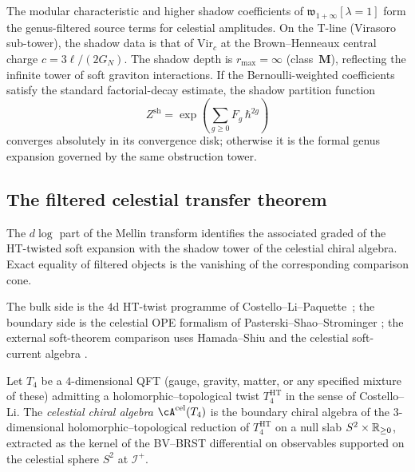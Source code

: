 \begin{remark}
\label{rem:ch-core-w-shadow}
The modular characteristic and higher shadow coefficients of
$\mathfrak{w}_{1+\infty}[\lambda = 1]$ form the genus-filtered
source terms for celestial amplitudes. On the T-line (Virasoro
sub-tower), the shadow data is that of $\mathrm{Vir}_c$ at the
Brown--Henneaux central charge $c = 3\ell/(2G_N)$. The shadow
depth is $r_{\max} = \infty$ (class~$\mathbf{M}$),
reflecting the infinite tower of soft graviton interactions.
If the Bernoulli-weighted coefficients satisfy the standard
factorial-decay estimate, the shadow partition function
\[
Z^{\mathrm{sh}}=\exp\!\left(\sum_{g\geq0}F_g\,\hbar^{2g}\right)
\]
converges absolutely in its convergence disk; otherwise it is the
formal genus expansion governed by the same obstruction tower.
\end{remark}


\subsection{The filtered celestial transfer theorem}
\label{subsec:filtered-celestial-transfer}

The $d\log$ part of the Mellin transform identifies the associated graded of the HT-twisted soft expansion with the shadow tower of the celestial chiral algebra. Exact equality of filtered objects is the vanishing of the corresponding comparison cone.

The bulk side is the $4$d HT-twist programme of
Costello--Li--Paquette~\cite{CL16,
CostelloPaquetteTwistedSugraStates}; the boundary side is the
celestial OPE formalism of Pasterski--Shao--Strominger
\cite{PasterskiShaoStromingerFlatSpaceHolog,StromingerLectures2018};
the external soft-theorem comparison uses Hamada--Shiu
\cite{HamadaShiuSubsubSoft} and the celestial soft-current algebra
\cite{GuevaraHimwichPateStrominger21,StromingerWInfinityCelestial}.

\begin{definition}
\label{def:celestial-chiral-algebra-ht-twist}
Let $T_4$ be a $4$-dimensional QFT (gauge, gravity, matter, or any
specified mixture of these) admitting a holomorphic--topological twist $T_4^{\mathrm{HT}}$
in the sense of Costello--Li. The \emph{celestial chiral algebra}
$\cA^{\mathrm{cel}}(T_4)$ is the boundary chiral algebra of the
$3$-dimensional holomorphic--topological reduction of $T_4^{\mathrm{HT}}$
on a null slab $S^2 \times \mathbb R_{\geq 0}$, extracted as the kernel of the
BV--BRST differential on observables supported on the celestial
sphere $S^2$ at $\mathscr{I}^+$.
\end{definition}

